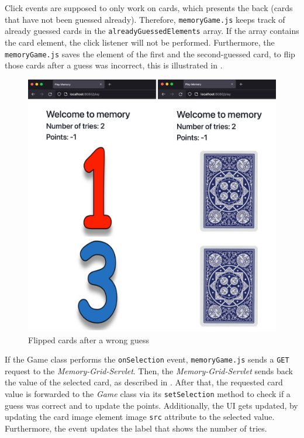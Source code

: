 Click events are supposed to only work on cards, which presents the back (cards that have not been guessed already). Therefore, \texttt{memoryGame.js} keeps track of already guessed cards in the \texttt{alreadyGuessedElements} array. If the array contains the card element, the click listener will not be performed.
Furthermore, the \texttt{memoryGame.js} saves the element of the first and the second-guessed card, to flip those cards after a guess was incorrect, this is illustrated in .
\begin{figure}[h]
\centering
\includegraphics[scale=0.1]{images/03_impl/frontend/wrong-guess}
\caption{Flipped cards after a wrong guess}
\label{fig:03_impl_frontend_memGame_flipped}
\end{figure}


If the Game class performs the \texttt{onSelection} event, \texttt{memoryGame.js} sends a \texttt{GET} request to the \textit{Memory-Grid-Servlet}. Then, the \textit{Memory-Grid-Servlet} sends back the value of the selected card, as described in . After that, the requested card value is forwarded to the \textit{Game} class via its \texttt{setSelection} method to check if a guess was correct and to update the points.
Additionally, the UI gets updated, by updating the card image element image \texttt{src} attribute to the selected value. Furthermore, the event updates the label that shows the number of tries.

